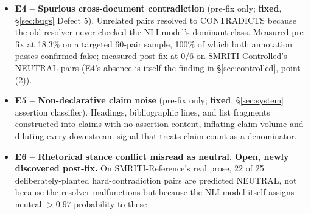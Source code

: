 \begin{itemize}
{    finding (audit round P0-9).} Measured by retaining every
    NLI-scored candidate (\texttt{--env eval}), not only the ones
    surviving production's NEUTRAL/UNKNOWN filters: of 1{,}089 total
    candidates Phase 6 scored across the full corpus, only 496 (45.6\%)
    correspond to a manifest-intended pair at all, and of all
    CONTRADICTS verdicts, 383 (55.2\%) are on non-intended pairs. This is
    not the same failure as E4 (the original arg-max/relatedness-gate
    bug, which produced false CONTRADICTS between claims sharing no real
    topic): these non-intended pairs were retrieved because embedding
    similarity genuinely found them close, most plausibly because many
    template families reuse a limited pool of attribute/verb phrases
    across dozens of different entities, so two \emph{different} intended
    pairs' claims can end up lexically closer to \emph{each other} than
    either is to some unrelated claim. Whether these 383 calls are
    themselves correct is not established (they were never given a
    construction-time label), but their volume relative to the 119
    intended, scored CONTRADICTS trials on TEST means gold-pair-only precision
    (finding 1, \S\ref{sec:results}) is measuring a curated slice of a
    much larger and largely unaudited set of real verdicts the same run
    produces.
  \item \textbf{E4 -- Spurious cross-document contradiction} (pre-fix
    only; \textbf{fixed}, \S\ref{sec:bugs} Defect 5). Unrelated pairs
    resolved to CONTRADICTS because the old resolver never checked the
    NLI model's dominant class. Measured pre-fix at 18.3\% on a
    targeted 60-pair sample, 100\% of which both annotation passes
    confirmed false; measured post-fix at 0/6 on SMRITI-Controlled's
    NEUTRAL pairs (E4's absence is itself the finding in
    \S\ref{sec:controlled}, point (2)).
  \item \textbf{E5 -- Non-declarative claim noise} (pre-fix only;
    \textbf{fixed}, \S\ref{sec:system} assertion classifier). Headings,
    bibliographic lines, and list fragments constructed into claims with
    no assertion content, inflating claim volume and diluting every
    downstream signal that treats claim count as a denominator.
  \item \textbf{E6 -- Rhetorical stance conflict misread as neutral.}
    \textbf{Open, newly discovered post-fix.} On SMRITI-Reference's real
    prose, 22 of 25 deliberately-planted hard-contradiction pairs are
    predicted NEUTRAL, not because the resolver malfunctions but because
    the NLI model itself assigns neutral $>0.97$ probability to these

\end{itemize}
